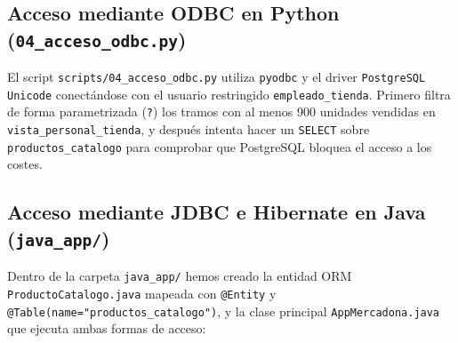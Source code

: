 \documentclass[a4paper,12pt]{article}
\begin{document}
\subsection{Acceso mediante ODBC en Python (\texttt{04\_acceso\_odbc.py})}
El script \texttt{scripts/04\_acceso\_odbc.py} utiliza \texttt{pyodbc} y el driver \texttt{PostgreSQL Unicode} conectándose con el usuario restringido \texttt{empleado\_tienda}. Primero filtra de forma parametrizada (\texttt{?}) los tramos con al menos 900 unidades vendidas en \texttt{vista\_personal\_tienda}, y después intenta hacer un \texttt{SELECT} sobre \texttt{productos\_catalogo} para comprobar que PostgreSQL bloquea el acceso a los costes.

\subsection{Acceso mediante JDBC e Hibernate en Java (\texttt{java\_app/})}
Dentro de la carpeta \texttt{java\_app/} hemos creado la entidad ORM \texttt{ProductoCatalogo.java} mapeada con \texttt{@Entity} y \texttt{@Table(name="productos\_catalogo")}, y la clase principal \texttt{AppMercadona.java} que ejecuta ambas formas de acceso:
\end{document}
